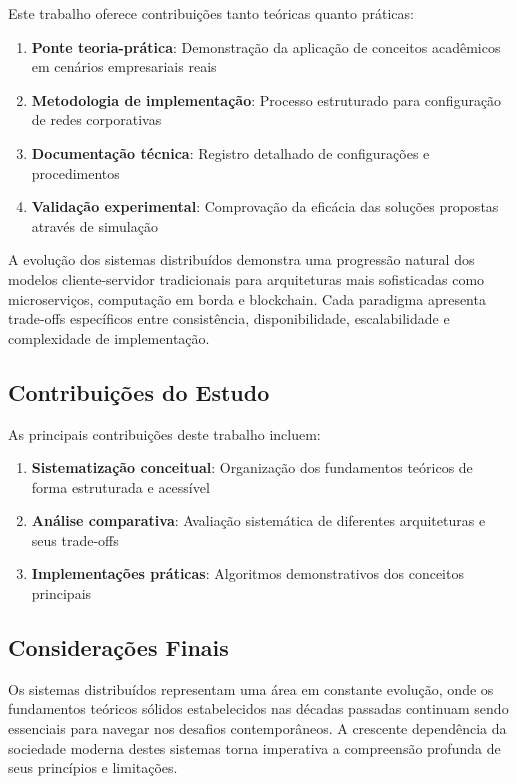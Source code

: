 Este trabalho oferece contribuições tanto teóricas quanto práticas:

\begin{enumerate}
    \item \textbf{Ponte teoria-prática}: Demonstração da aplicação de conceitos acadêmicos em cenários empresariais reais
    \item \textbf{Metodologia de implementação}: Processo estruturado para configuração de redes corporativas
    \item \textbf{Documentação técnica}: Registro detalhado de configurações e procedimentos
    \item \textbf{Validação experimental}: Comprovação da eficácia das soluções propostas através de simulação
\end{enumerate}

A evolução dos sistemas distribuídos demonstra uma progressão natural dos modelos cliente-servidor tradicionais para arquiteturas mais sofisticadas como microserviços, computação em borda e blockchain. Cada paradigma apresenta trade-offs específicos entre consistência, disponibilidade, escalabilidade e complexidade de implementação.

\subsection{Contribuições do Estudo}

As principais contribuições deste trabalho incluem:

\begin{enumerate}
    \item \textbf{Sistematização conceitual}: Organização dos fundamentos teóricos de forma estruturada e acessível
    \item \textbf{Análise comparativa}: Avaliação sistemática de diferentes arquiteturas e seus trade-offs
    \item \textbf{Implementações práticas}: Algoritmos demonstrativos dos conceitos principais
    
\end{enumerate}


\subsection{Considerações Finais}

Os sistemas distribuídos representam uma área em constante evolução, onde os fundamentos teóricos sólidos estabelecidos nas décadas passadas continuam sendo essenciais para navegar nos desafios contemporâneos. A crescente dependência da sociedade moderna destes sistemas torna imperativa a compreensão profunda de seus princípios e limitações.

